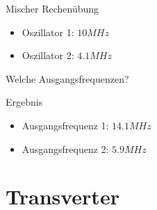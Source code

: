\begin{frame}
  \begin{exampleblock}{Mischer Rechenübung}
    \begin{itemize}
      \item Oszillator 1: $10 MHz$
      \item Oszillator 2: $4.1 MHz$
    \end{itemize}
    Welche Ausgangsfrequenzen?
  \end{exampleblock}
  \pause
  \begin{exampleblock}{Ergebnis}
    \begin{itemize}
      \item Ausgangsfrequenz 1: $14.1 MHz$
      \item Ausgangsfrequenz 2: $5.9 MHz$
    \end{itemize}
  \end{exampleblock}
\end{frame}

%

\section*{Transverter}


